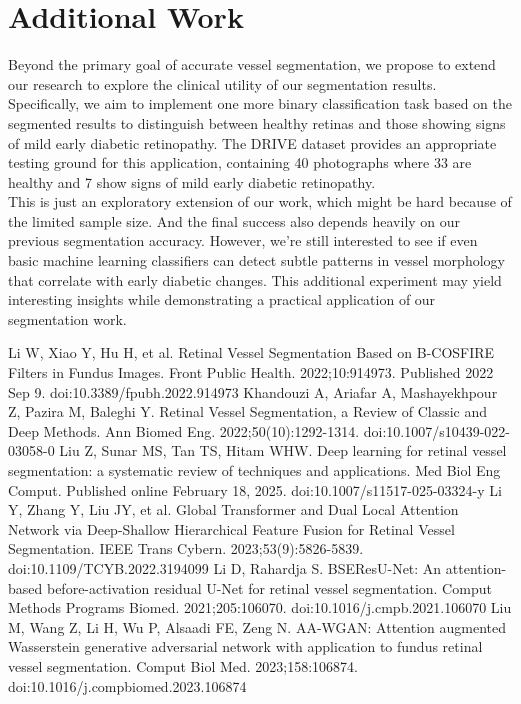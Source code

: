 \documentclass[12pt,letterpaper]{article}
\begin{document}
\section{Additional Work}
Beyond the primary goal of accurate vessel segmentation, we propose to extend our research to explore the clinical utility of our segmentation results. Specifically, we aim to implement one more binary classification task based on the segmented results to distinguish between healthy retinas and those showing signs of mild early diabetic retinopathy. The DRIVE dataset provides an appropriate testing ground for this application, containing 40 photographs where 33 are healthy and 7 show signs of mild early diabetic retinopathy. \\
This is just an exploratory extension of our work, which might be hard because of the limited sample size. And the final success also depends heavily on our previous segmentation accuracy. However, we're still interested to see if even basic machine learning classifiers can detect subtle patterns in vessel morphology that correlate with early diabetic changes. This additional experiment may yield interesting insights while demonstrating a practical application of our segmentation work.



\begin{thebibliography}{9}
 Li W, Xiao Y, Hu H, et al. Retinal Vessel Segmentation Based on B-COSFIRE Filters in Fundus Images. Front Public Health. 2022;10:914973. Published 2022 Sep 9. doi:10.3389/fpubh.2022.914973
 Khandouzi A, Ariafar A, Mashayekhpour Z, Pazira M, Baleghi Y. Retinal Vessel Segmentation, a Review of Classic and Deep Methods. Ann Biomed Eng. 2022;50(10):1292-1314. doi:10.1007/s10439-022-03058-0
 Liu Z, Sunar MS, Tan TS, Hitam WHW. Deep learning for retinal vessel segmentation: a systematic review of techniques and applications. Med Biol Eng Comput. Published online February 18, 2025. doi:10.1007/s11517-025-03324-y
 Li Y, Zhang Y, Liu JY, et al. Global Transformer and Dual Local Attention Network via Deep-Shallow Hierarchical Feature Fusion for Retinal Vessel Segmentation. IEEE Trans Cybern. 2023;53(9):5826-5839. doi:10.1109/TCYB.2022.3194099
 Li D, Rahardja S. BSEResU-Net: An attention-based before-activation residual U-Net for retinal vessel segmentation. Comput Methods Programs Biomed. 2021;205:106070. doi:10.1016/j.cmpb.2021.106070
 Liu M, Wang Z, Li H, Wu P, Alsaadi FE, Zeng N. AA-WGAN: Attention augmented Wasserstein generative adversarial network with application to fundus retinal vessel segmentation. Comput Biol Med. 2023;158:106874. doi:10.1016/j.compbiomed.2023.106874
\end{thebibliography}
\end{document}
